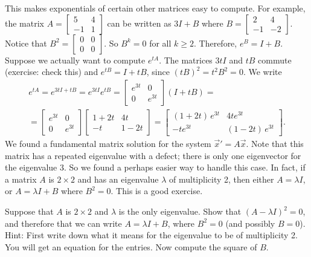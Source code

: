 This makes exponentials of certain other matrices easy to compute.  
For example, the matrix
$A = \left[ \begin{smallmatrix} 5 & 4 \\ -1 & 1 \end{smallmatrix} \right]$
can be written as
$3I + B$ where
$B = \left[ \begin{smallmatrix} 2 & 4 \\ -1 & -2 \end{smallmatrix} \right]$.
Notice that $B^2 = 
\left[ \begin{smallmatrix} 0 & 0 \\ 0 & 0 \end{smallmatrix} \right]$.  So
$B^k = 0$ for all $k \geq 2$.  Therefore, $e^B = I + B$.  Suppose we
actually want to compute $e^{tA}$.  The matrices $3tI$ and $tB$ commute
(exercise: check this)
and $e^{tB} = I + tB$, since ${(tB)}^2 = t^2 B^2 = 0$.
We write
\begin{multline*}
e^{tA} = 
e^{3tI + tB} = e^{3tI} e^{tB} = 
\begin{bmatrix} e^{3t} & 0 \\ 0 & e^{3t} \end{bmatrix}
\left(
I + tB
\right)
=
\\
=
\begin{bmatrix} e^{3t} & 0 \\ 0 & e^{3t} \end{bmatrix}
\begin{bmatrix} 1+2t & 4t \\ -t & 1-2t \end{bmatrix}
=
\begin{bmatrix} (1+2t)\,e^{3t} & 4te^{3t} \\ -te^{3t} & (1-2t)\,e^{3t} \end{bmatrix} .
\end{multline*}
We found a fundamental matrix solution for the
system ${\vec{x}}' = A \vec{x}$.  Note that this matrix has a repeated
eigenvalue with a defect; there is only one eigenvector for the eigenvalue
3.  So we found a perhaps easier way to handle this case.  In fact, if
a matrix $A$ is $2 \times 2$ and has an eigenvalue $\lambda$ of multiplicity
2, then
either $A = \lambda I$, or $A = \lambda I + B$ where $B^2 = 0$.  This is a
good exercise.

\begin{exercise}%
Suppose that $A$ is $2 \times 2$ and $\lambda$
is the only eigenvalue.  Show that ${(A - \lambda I)}^2 = 0$, and therefore
that we can write $A = \lambda I + B$, where $B^2 = 0$ (and possibly $B=0$).
Hint: First
write down what it means for the eigenvalue to be of multiplicity 2.
You will get
an equation for the entries.  Now compute the square of $B$.
\end{exercise}

